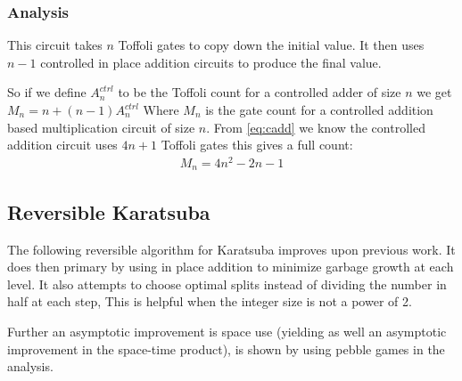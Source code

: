     \subsubsection{Analysis}
      This circuit takes $n$ Toffoli gates to copy down the initial value.
      It then uses $n-1$ controlled in place addition circuits to produce the final value.

      So if we define $A^{ctrl}_n$ to be the Toffoli count for a controlled adder of size $n$ we get $M_n = n + (n-1)A^{ctrl}_n$
      Where $M_n$ is the gate count for a controlled addition based multiplication circuit of size $n$.
      From \eqref{eq:cadd} we know the controlled addition circuit uses $4n+1$ Toffoli gates this gives a full count:
      \begin{align} \label{eq:caddtoff}
        M_n = 4n^2 - 2n -1
      \end{align}

\subsection{Reversible Karatsuba}

    The following reversible algorithm for Karatsuba improves upon previous
    work\cite{PF:2006}.  It does then primary by using in place addition to
    minimize garbage growth at each level.  It also attempts to choose optimal
    splits instead of dividing the number in half at each step, This is helpful
    when the integer size is not a power of 2.

    Further an asymptotic improvement is space use (yielding as well an
    asymptotic improvement in the space-time product), is shown by using pebble
    games in the analysis. 

